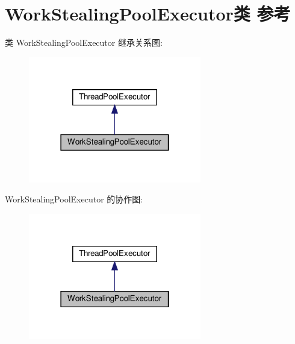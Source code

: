 \hypertarget{classWorkStealingPoolExecutor}{}\section{Work\+Stealing\+Pool\+Executor类 参考}
\label{classWorkStealingPoolExecutor}


类 Work\+Stealing\+Pool\+Executor 继承关系图\+:
\nopagebreak
\begin{figure}[H]
\begin{center}
\leavevmode
\includegraphics[width=214pt]{classWorkStealingPoolExecutor__inherit__graph}
\end{center}
\end{figure}


Work\+Stealing\+Pool\+Executor 的协作图\+:
\nopagebreak
\begin{figure}[H]
\begin{center}
\leavevmode
\includegraphics[width=214pt]{classWorkStealingPoolExecutor__coll__graph}
\end{center}
\end{figure}
